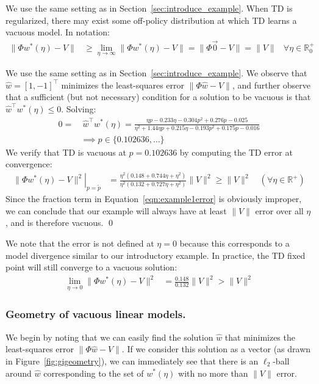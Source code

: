 \begin{example}\label{ex:withrr}
	We use the same setting as in Section~\ref{sec:introduce_example}.
	When TD is regularized, there may exist some off-policy distribution at which TD learns a vacuous model. In notation:
	\begin{align}
		\|\Phi w^*(\eta) - V\| & \geq \lim_{\eta\to\infty} \|\Phi w^*(\eta) - V \| = \|\Phi \vec 0 - V \| = \|V \| & \forall \eta\in\mathbb{R}_0^+ \label{eqn:vacuoustd}
	\end{align}

	\proof{} We use the same setting as in Section~\ref{sec:introduce_example}.
	We observe that $\hat w = {[1, -1]}^\top$ minimizes the least-squares error $\|\Phi \hat w - V\|$, and further observe that a sufficient (but not necessary) condition for a solution to be vacuous is that $\hat w^\top w^*(\eta) \leq 0$. Solving:
	\begin{align}
		0= & ~ \hat w^\top w^*(\eta) =
		\frac{\eta p-0.233 \eta-0.304 p^2+0.276 p-0.025}{\eta^2+1.44 \eta p+0.215 \eta-0.193 p^2+0.175 p-0.016}
		\\ & \implies p \in \{0.102636, \ldots\}
	\end{align}
	We verify that TD is vacuous at $p=0.102636$ by computing the TD error at convergence:
	\begin{align}
		\left. \|\Phi w^*(\eta) - V\|^2 \right|_{p=\tilde p} & =
		\frac{\eta^2 (0.148 + 0.744 \eta + \eta^2)}{ \eta^2 (0.132 + 0.727 \eta + \eta^2)} \|V\|^2 \geq \|V\|^2\quad(\forall \eta \in \mathbb R^+) \label{eqn:example1error}
	\end{align}
	Since the fraction term in Equation~\ref{eqn:example1error} is obviously improper, we can conclude that our example will always have at least $\|V\|$ error over all $\eta$, and is therefore vacuous. \qed
\end{example}
We note that the error is not defined at $\eta=0$ because this corresponds to a model divergence similar to our introductory example. In practice, the TD fixed point will still converge to a vacuous solution:
\begin{align}
	\lim_{\eta\to 0} \|\Phi w^*(\eta) - V\|^2 & = \frac{0.148}{0.132} \|V\|^2 > \|V\|^2
\end{align}

\subsubsection{Geometry of vacuous linear models. }
We begin by noting that we can easily find the solution $\hat w$ that minimizes the least-squares error $\|\Phi \hat w - V\|$. If we consider this solution as a vector (as drawn in Figure~\ref*{fig:gigeometry}), we can immediately see that there is an $\ell_2$-ball around $\hat w$ corresponding to the set of $w^*(\eta)$ with no more than $\|V\|$ error.

